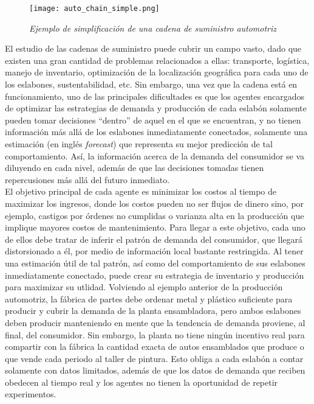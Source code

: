 \begin{figure}[ht]
\caption{\textit{Ejemplo de simplificaci\'on de una cadena de suministro automotriz}}
\label{automotriz}
\texttt{[image: auto\_chain\_simple.png]}
\centering
\end{figure}


El estudio de las cadenas de suministro puede cubrir un campo vasto, dado que existen una gran cantidad de problemas relacionados a ellas: transporte, log\'istica, manejo de inventario, optimizaci\'on de la localizaci\'on geogr\'afica para cada uno de los eslabones, sustentabilidad, etc. Sin embargo, una vez que la cadena est\'a en funcionamiento, uno de las principales dificultades es que los agentes encargados de optimizar las estrategias de demanda y producci\'on de cada eslab\'on solamente pueden tomar decisiones ``dentro'' de aquel en el que se encuentran, y no tienen informaci\'on m\'as all\'a de los eslabones inmediatamente conectados, solamente una estimaci\'on (en ingl\'es \textit{forecast}) que representa su mejor predicci\'on de tal comportamiento. As\'i, la informaci\'on acerca de la demanda del consumidor se va diluyendo en cada nivel, además de que las decisiones tomadas tienen repercusiones m\'as all\'a del futuro inmediato. \\

El objetivo principal de cada agente es minimizar los costos al tiempo de maximizar los ingresos, donde los costos pueden no ser flujos de dinero sino, por ejemplo, castigos por \'ordenes no cumplidas o varianza alta en la producci\'on que implique mayores costos de mantenimiento. Para llegar a este objetivo, cada uno de ellos debe tratar de inferir el patr\'on de demanda del consumidor, que llegar\'a distorsionado a \'el, por medio de información local bastante restringida. Al tener una estimaci\'on \'util de tal patr\'on, as\'i como del comportamiento de sus eslabones inmediatamente conectado, puede crear su estrategia de inventario y producci\'on para maximizar su utlidad. Volviendo al ejemplo anterior de la producci\'on automotriz, la f\'abrica de partes debe ordenar metal y pl\'astico suficiente para producir y cubrir la demanda de la planta ensambladora, pero ambos eslabones deben producir manteniendo en mente que la tendencia de demanda proviene, al final, del consumidor. Sin embargo, la planta no tiene ning\'un incentivo real para compartir con la f\'abrica la cantidad exacta de autos ensamblados que produce o que vende cada periodo al taller de pintura. Esto obliga a cada eslab\'on a contar solamente con datos limitados, adem\'as de que los datos de demanda que reciben obedecen al tiempo real y los agentes no tienen la oportunidad de repetir experimentos.\\

